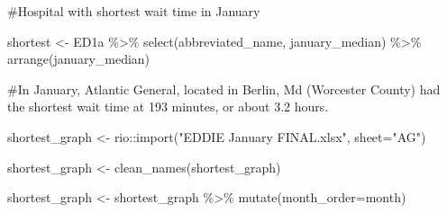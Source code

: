 \documentclass[
  letterpaper,
  DIV=11,
  numbers=noendperiod]{scrartcl}
\newenvironment{Shaded}{\begin{snugshade}}{\end{snugshade}}
\newcommand{\AttributeTok}[1]{\textcolor[rgb]{0.40,0.45,0.13}{#1}}
\newcommand{\CommentTok}[1]{\textcolor[rgb]{0.37,0.37,0.37}{#1}}
\newcommand{\FunctionTok}[1]{\textcolor[rgb]{0.28,0.35,0.67}{#1}}
\newcommand{\NormalTok}[1]{\textcolor[rgb]{0.00,0.23,0.31}{#1}}
\newcommand{\OtherTok}[1]{\textcolor[rgb]{0.00,0.23,0.31}{#1}}
\newcommand{\SpecialCharTok}[1]{\textcolor[rgb]{0.37,0.37,0.37}{#1}}
\newcommand{\StringTok}[1]{\textcolor[rgb]{0.13,0.47,0.30}{#1}}
\begin{document}
\begin{Shaded}
\begin{Highlighting}[]
\CommentTok{\#Hospital with shortest wait time in January}

\NormalTok{shortest }\OtherTok{\textless{}{-}}\NormalTok{ ED1a }\SpecialCharTok{\%\textgreater{}\%} 
  \FunctionTok{select}\NormalTok{(abbreviated\_name, january\_median) }\SpecialCharTok{\%\textgreater{}\%} 
  \FunctionTok{arrange}\NormalTok{(january\_median)}

\CommentTok{\#In January, Atlantic General, located in Berlin, Md (Worcester County) had the  shortest wait time at 193 minutes, or about 3.2 hours.}

\NormalTok{shortest\_graph }\OtherTok{\textless{}{-}}\NormalTok{ rio}\SpecialCharTok{::}\FunctionTok{import}\NormalTok{(}\StringTok{"EDDIE January FINAL.xlsx"}\NormalTok{, }\AttributeTok{sheet=}\StringTok{"AG"}\NormalTok{)}

\NormalTok{shortest\_graph }\OtherTok{\textless{}{-}} \FunctionTok{clean\_names}\NormalTok{(shortest\_graph)}

\NormalTok{shortest\_graph }\OtherTok{\textless{}{-}}\NormalTok{ shortest\_graph }\SpecialCharTok{\%\textgreater{}\%} 
  \FunctionTok{mutate}\NormalTok{(}\AttributeTok{month\_order=}\NormalTok{month) }


\end{Highlighting}
\end{Shaded}
\end{document}
